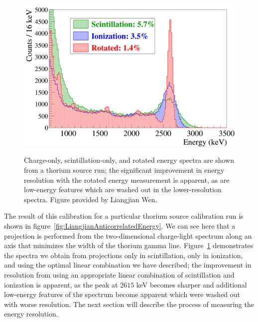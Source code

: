 \begin{figure}
\begin{center}
\includegraphics[keepaspectratio=true,width=\textwidth]{RotationTh2D_ImprovementInResolution.png}
\end{center}
\renewcommand{\baselinestretch}{1}
\small\normalsize
\begin{quote}
\caption{Charge-only, scintillation-only, and rotated energy spectra are shown from a thorium source run; the significant improvement in energy resolution with the rotated energy measurement is apparent, as are low-energy features which are washed out in the lower-resolution spectra.  Figure provided by Liangjian Wen.}
\label{fig:LiangjianRotatedSpectrumImprovement}
\end{quote}
\end{figure}
\renewcommand{\baselinestretch}{2}
\small\normalsize

The result of this calibration for a particular thorium source calibration run is shown in figure~\ref{fig:LiangjianAnticorrelatedEnergy}.  We can see here that a projection is performed from the two-dimensional charge-light spectrum along an axis that minimizes the width of the thorium gamma line.  Figure~\ref{fig:LiangjianRotatedSpectrumImprovement} demonstrates the spectra we obtain from projections only in scintillation, only in ionization, and using the optimal linear combination we have described; the improvement in resolution from using an appropriate linear combination of scintillation and ionization is apparent, as the peak at $2615$ keV becomes sharper and additional low-energy features of the spectrum become apparent which were washed out with worse resolution.  The next section will describe the process of measuring the energy resolution.

